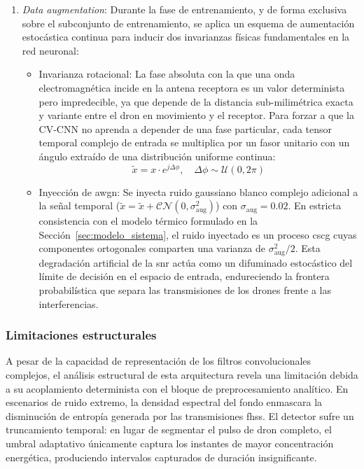\begin{enumerate}
    \item \textit{Data augmentation}:
    Durante la fase de entrenamiento, y de forma exclusiva sobre el subconjunto de entrenamiento, se aplica un esquema de aumentación estocástica continua para inducir dos invarianzas físicas fundamentales en la red neuronal:
    \begin{itemize}
        \item Invarianza rotacional: La fase absoluta con la que una onda electromagnética incide en la antena receptora es un valor determinista pero impredecible, ya que depende de la distancia sub-milimétrica exacta y variante entre el dron en movimiento y el receptor. Para forzar a que la CV-CNN no aprenda a depender de una fase particular, cada tensor temporal complejo de entrada se multiplica por un fasor unitario con un ángulo extraído de una distribución uniforme continua:
        \begin{equation}
            \tilde{x} = x \cdot e^{j\Delta\phi}, \quad \Delta\phi \sim \mathcal{U}(0, 2\pi)
        \end{equation}
        \item Inyección de \gls{awgn}: Se inyecta ruido gaussiano blanco complejo adicional a la señal temporal ($\tilde{x} = \tilde{x} + \mathcal{CN}(0, \sigma_{\text{aug}}^2)$) con $\sigma_{\text{aug}} = 0.02$. En estricta consistencia con el modelo térmico formulado en la Sección~\ref{sec:modelo_sistema}, el ruido inyectado es un proceso \gls{cscg} cuyas componentes ortogonales comparten una varianza de $\sigma_{\text{aug}}^2/2$. Esta degradación artificial de la \gls{snr} actúa como un difuminado estocástico del límite de decisión en el espacio de entrada, endureciendo la frontera probabilística que separa las transmisiones de los drones frente a las interferencias.
    \end{itemize}
\end{enumerate}

\subsubsection{Limitaciones estructurales}
A pesar de la capacidad de representación de los filtros convolucionales complejos, el análisis estructural de esta arquitectura revela una limitación debida a su acoplamiento determinista con el bloque de preprocesamiento analítico. En escenarios de ruido extremo, la densidad espectral del fondo enmascara la disminución de entropía generada por las transmisiones \gls{fhss}. El detector sufre un truncamiento temporal: en lugar de segmentar el pulso de dron completo, el umbral adaptativo únicamente captura los instantes de mayor concentración energética, produciendo intervalos capturados de duración insignificante.

